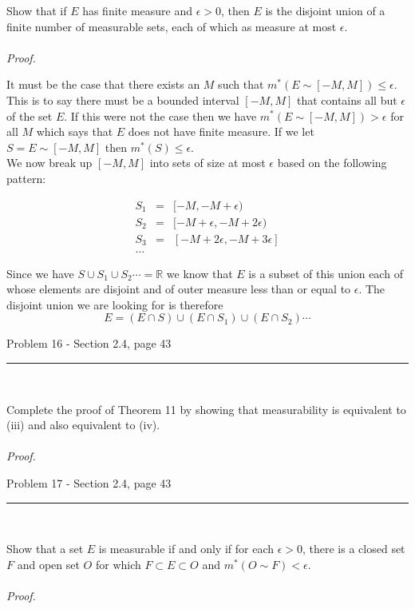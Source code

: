 \documentclass[11pt,reqno]{article}
\begin{document}
Show that if $E$ has finite measure and $\epsilon > 0$, then $E$ is the disjoint union of a finite number of measurable sets, each of which as measure at most $\epsilon$.
\\\\ \emph{Proof.}

It must be the case that there exists an $M$ such that $m^*(E \sim [-M, M]) \le \epsilon$.  This is to say there must be a bounded interval $[-M, M]$ that contains all but $\epsilon$ of the set $E$. If this were not the case then we have  $m^*(E \sim [-M, M]) > \epsilon$ for all $M$ which says that $E$ does not have finite measure. If we let $S = E \sim [-M, M]$ then $m^*(S) \le \epsilon$.\\
\indent We now break up $[-M, M]$ into sets of size at most $\epsilon$ based on the following pattern:

\begin{eqnarray*}
S_1 &=& [-M, -M + \epsilon)\\
S_2 &=& [-M + \epsilon, -M + 2 \epsilon)\\
S_3 &=& [-M + 2 \epsilon, -M + 3 \epsilon]\\
\ldots&&
\end{eqnarray*}

\indent Since we have $S \cup S_1 \cup S_2 \cdots = \mathbb{R}$ we know that $E$ is a subset of this union each of whose elements are disjoint and of outer measure less than or equal to $\epsilon$. The disjoint union we are looking for is therefore
\[ E = (E \cap S) \cup (E \cap S_1) \cup (E \cap S_2) \cdots \]


\begin{flushleft} 
Problem 16 - Section 2.4, page 43\\
\rule{500pt}{1pt}\\
\end{flushleft} 

Complete the proof of Theorem 11 by showing that measurability is equivalent to (iii) and also equivalent to (iv).
\\\\ \emph{Proof.}

\begin{flushleft} 
Problem 17 - Section 2.4, page 43\\
\rule{500pt}{1pt}\\
\end{flushleft} 

Show that a set $E$ is measurable if and only if for each $\epsilon > 0$,  there is a closed set $F$ and open set $O$ for which $F \subset E \subset O$  and $m^*(O \sim F) < \epsilon$.
\\\\ \emph{Proof.}
\end{document}
